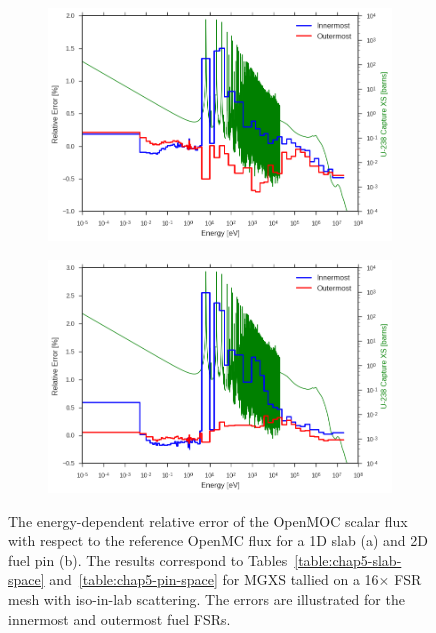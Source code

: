 \begin{figure}[H]
\begin{subfigure}{.9\textwidth}
  \centering
  \includegraphics[width=\linewidth]{figures/biases/slab/rel-err-inner-outer}
  \caption{}
\end{subfigure}
\begin{subfigure}{.9\textwidth}
  \centering
  \includegraphics[width=\linewidth]{figures/biases/pin-cell/rel-err-inner-outer}
  \caption{}
\end{subfigure}
\caption[Flux relative error by energy group]{The energy-dependent relative error of the OpenMOC scalar flux with respect to the reference OpenMC flux for a 1D slab (a) and 2D fuel pin (b). The results correspond to Tables~\ref{table:chap5-slab-space} and~\ref{table:chap5-pin-space} for \ac{MGXS} tallied on a 16$\times$ \ac{FSR} mesh with iso-in-lab scattering. The errors are illustrated for the innermost and outermost fuel \ac{FSR}s.}
\label{fig:chap5-rel-err-energy}
\end{figure}

